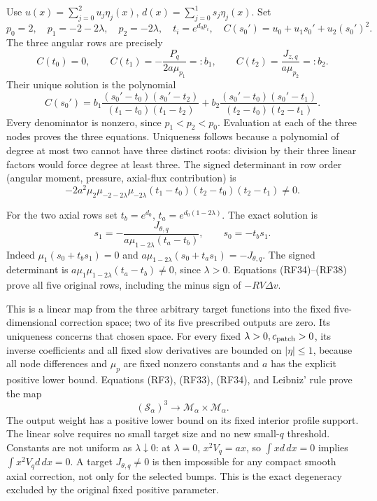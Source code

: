 \documentclass[10pt,a4paper]{article}
\begin{document}
Use \(u(x)=\sum_{j=0}^2u_j\eta_j(x)\),
\(d(x)=\sum_{j=0}^1s_j\eta_j(x)\). Set
\[
p_0=2,\quad p_1=-2-2\lambda,\quad p_2=-2\lambda,
\quad t_i=e^{d_0p_i},\quad C(s_0')=u_0+u_1s_0'+u_2(s_0')^2.
\]
The three angular rows are precisely
\[
C(t_0)=0,\qquad C(t_1)=-\frac{P_q}{2a\mu_{p_1}}=:b_1,
\qquad C(t_2)=\frac{J_{z,q}}{a\mu_{p_2}}=:b_2.
\]
Their unique solution is the polynomial
\[
C(s_0')=b_1\frac{(s_0'-t_0)(s_0'-t_2)}{(t_1-t_0)(t_1-t_2)}
+b_2\frac{(s_0'-t_0)(s_0'-t_1)}{(t_2-t_0)(t_2-t_1)}.
\tag{RF36}
\]
Every denominator is nonzero, since \(p_1<p_2<p_0\).
Evaluation at each of the three nodes proves the three equations.
Uniqueness follows because a polynomial of degree at most two cannot
have three distinct roots: division by their three linear factors
would force degree at least three. The signed determinant in row
order (angular moment, pressure, axial-flux contribution) is
\[
-2a^2\mu_2\mu_{-2-2\lambda}\mu_{-2\lambda}
(t_1-t_0)(t_2-t_0)(t_2-t_1)\ne0.
\tag{RF37}
\]

For the two axial rows set \(t_b=e^{d_0}\),
\(t_a=e^{d_0(1-2\lambda)}\). The exact solution is
\[
s_1=-\frac{J_{\theta,q}}{a\mu_{1-2\lambda}(t_a-t_b)},
\qquad s_0=-t_bs_1.
\tag{RF38}
\]
Indeed \(\mu_1(s_0+t_bs_1)=0\) and
\(a\mu_{1-2\lambda}(s_0+t_as_1)=-J_{\theta,q}\).
The signed determinant is
\(a\mu_1\mu_{1-2\lambda}(t_a-t_b)\ne0\), since
\(\lambda>0\). Equations (RF34)--(RF38) prove all five original
rows, including the minus sign of \(-RV\Delta v\).

This is a linear map from the three arbitrary target functions into
the fixed five-dimensional correction space; two of its five prescribed
outputs are zero. Its uniqueness concerns that chosen space. For every
fixed \(\lambda>0,c_{\rm patch}>0\), its inverse coefficients and
all fixed slow derivatives are bounded on \(|\eta|\le1\),
because all node differences and \(\mu_p\) are fixed nonzero
constants and \(a\) has the explicit positive lower bound. Equations
(RF3), (RF33), (RF34), and Leibniz' rule prove the map
\[
(\mathcal S_\alpha)^3\longrightarrow
\mathcal M_\alpha\times\mathcal M_\alpha.
\tag{RF39}
\]
The output weight has a positive lower bound on its fixed interior
profile support. The linear solve requires no small target size and
no new small-\(q\) threshold. Constants are not uniform as
\(\lambda\downarrow0\): at \(\lambda=0\),
\(x^2V_q=ax\), so \(\int xd\,dx=0\) implies
\(\int x^2V_qd\,dx=0\). A target \(J_{\theta,q}\ne0\)
is then impossible for any compact smooth axial correction, not only
for the selected bumps. This is the exact degeneracy excluded by the
original fixed positive parameter.
\end{document}
